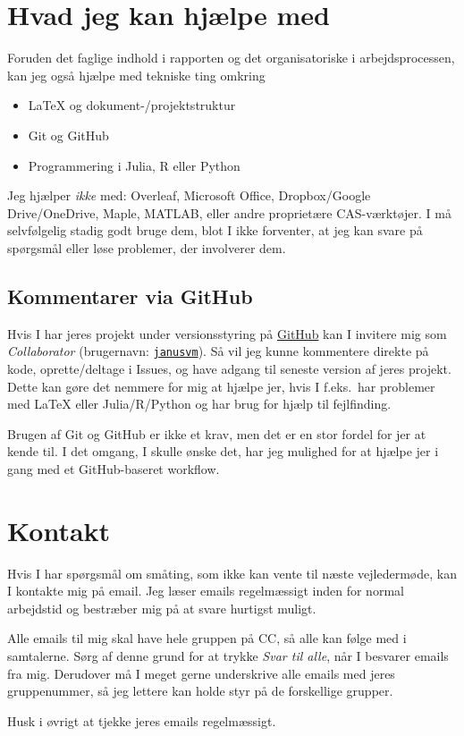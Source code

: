 \documentclass[12pt,a4paper,oneside,final]{article}
\begin{document}
\section{Hvad jeg kan hjælpe med}
Foruden det faglige indhold i rapporten og det organisatoriske i arbejdsprocessen, kan jeg også hjælpe med tekniske ting omkring
\begin{itemize}
\item \LaTeX{} og dokument-/projektstruktur
\item Git og GitHub
\item Programmering i Julia, R eller Python
\end{itemize}
Jeg hjælper \emph{ikke} med: Overleaf, Microsoft Office, Dropbox/Google Drive/OneDrive, Maple, MATLAB, eller andre proprietære CAS-værktøjer.
I må selvfølgelig stadig godt bruge dem, blot I ikke forventer, at jeg kan svare på spørgsmål eller løse problemer, der involverer dem.

\subsection{Kommentarer via GitHub}
Hvis I har jeres projekt under versionsstyring på \href{https://github.com}{GitHub} kan I invitere mig som \emph{Collaborator} (brugernavn: \href{https://github.com/janusvm}{\texttt{janusvm}}).
Så vil jeg kunne kommentere direkte på kode, oprette/deltage i Issues, og have adgang til seneste version af jeres projekt.
Dette kan gøre det nemmere for mig at hjælpe jer, hvis I f.eks.\ har problemer med \LaTeX{} eller Julia/R/Python og har brug for hjælp til fejlfinding.

Brugen af Git og GitHub er ikke et krav, men det er en stor fordel for jer at kende til.
I det omgang, I skulle ønske det, har jeg mulighed for at hjælpe jer i gang med et GitHub-baseret workflow.

\section{Kontakt}
Hvis I har spørgsmål om småting, som ikke kan vente til næste vejledermøde, kan I kontakte mig på email.
Jeg læser emails regelmæssigt inden for normal arbejdstid og bestræber mig på at svare hurtigst muligt.

Alle emails til mig skal have hele gruppen på CC, så alle kan følge med i samtalerne.
Sørg af denne grund for at trykke \emph{Svar til alle}, når I besvarer emails fra mig.
Derudover må I meget gerne underskrive alle emails med jeres gruppenummer, så jeg lettere kan holde styr på de forskellige grupper.

Husk i øvrigt at tjekke jeres emails regelmæssigt.
\end{document}
